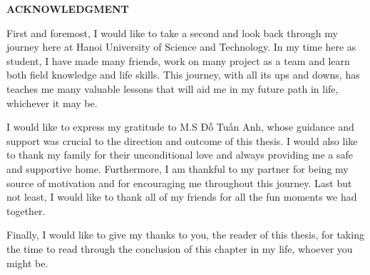 \begin{center}
    \Large{\textbf{ACKNOWLEDGMENT}}\\
\end{center}
\vspace{1cm}

First and foremost, I would like to take a second and look back through my journey here at Hanoi University of Science and Technology. In my time here as student, I have made many friends, work on many project as a team and learn both field knowledge and life skills. This journey, with all its ups and downs, has teaches me many valuable lessons that will aid me in my future path in life, whichever it may be.

I would like to express my gratitude to M.S Đỗ Tuấn Anh, whose guidance and support was crucial to the direction and outcome of this thesis. I would also like to thank my family for their unconditional love and always providing me a safe and supportive home. Furthermore, I am thankful to my partner for being my source of motivation and for encouraging me throughout this journey. Last but not least, I would like to thank all of my friends for all the fun moments we had together.

Finally, I would like to give my thanks to you, the reader of this thesis, for taking the time to read through the conclusion of this chapter in my life, whoever you might be.
